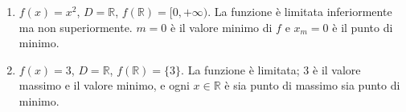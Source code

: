 \documentclass[11pt,a4paper]{article}
\begin{document}
\begin{esempio}
\leavevmode
\begin{enumerate}
    \item $f(x) = x^2$, $D = \mathbb{R}$, $f(\mathbb{R}) = [0, +\infty)$. La funzione è limitata inferiormente ma non superiormente. $m = 0$ è il valore minimo di $f$ e $x_m = 0$ è il punto di minimo.
    \item $f(x) = 3$, $D = \mathbb{R}$, $f(\mathbb{R}) = \{3\}$. La funzione è limitata; $3$ è il valore massimo e il valore minimo, e ogni $x \in \mathbb{R}$ è sia punto di massimo sia punto di minimo.
\end{enumerate}
\end{esempio}
\end{document}
